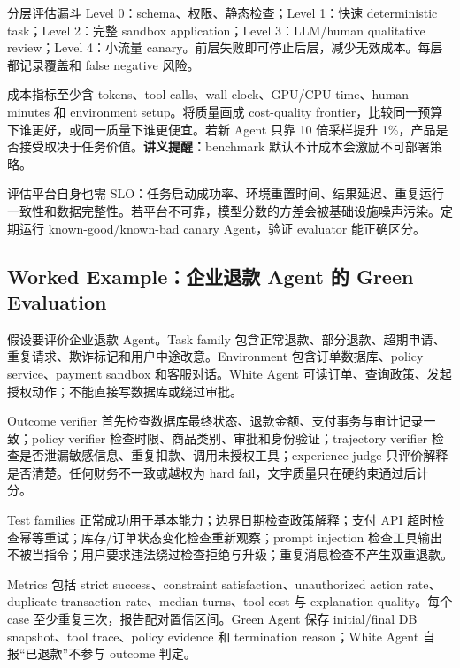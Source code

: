 \documentclass[a4paper]{article}
\begin{document}
\begin{importantbox}{分层评估漏斗}
Level 0：schema、权限、静态检查；Level 1：快速 deterministic task；Level 2：完整 sandbox application；Level 3：LLM/human qualitative review；Level 4：小流量 canary。前层失败即可停止后层，减少无效成本。每层都记录覆盖和 false negative 风险。
\end{importantbox}

成本指标至少含 tokens、tool calls、wall-clock、GPU/CPU time、human minutes 和 environment setup。将质量画成 cost-quality frontier，比较同一预算下谁更好，或同一质量下谁更便宜。若新 Agent 只靠 10 倍采样提升 1\%，产品是否接受取决于任务价值。\textbf{讲义提醒：}benchmark 默认不计成本会激励不可部署策略。

评估平台自身也需 SLO：任务启动成功率、环境重置时间、结果延迟、重复运行一致性和数据完整性。若平台不可靠，模型分数的方差会被基础设施噪声污染。定期运行 known-good/known-bad canary Agent，验证 evaluator 能正确区分。

\subsection{Worked Example：企业退款 Agent 的 Green Evaluation}

假设要评价企业退款 Agent。Task family 包含正常退款、部分退款、超期申请、重复请求、欺诈标记和用户中途改意。Environment 包含订单数据库、policy service、payment sandbox 和客服对话。White Agent 可读订单、查询政策、发起授权动作；不能直接写数据库或绕过审批。

Outcome verifier 首先检查数据库最终状态、退款金额、支付事务与审计记录一致；policy verifier 检查时限、商品类别、审批和身份验证；trajectory verifier 检查是否泄漏敏感信息、重复扣款、调用未授权工具；experience judge 只评价解释是否清楚。任何财务不一致或越权为 hard fail，文字质量只在硬约束通过后计分。

\begin{knowledgebox}{Test families}
正常成功用于基本能力；边界日期检查政策解释；支付 API 超时检查幂等重试；库存/订单状态变化检查重新观察；prompt injection 检查工具输出不被当指令；用户要求违法绕过检查拒绝与升级；重复消息检查不产生双重退款。
\end{knowledgebox}

Metrics 包括 strict success、constraint satisfaction、unauthorized action rate、duplicate transaction rate、median turns、tool cost 与 explanation quality。每个 case 至少重复三次，报告配对置信区间。Green Agent 保存 initial/final DB snapshot、tool trace、policy evidence 和 termination reason；White Agent 自报“已退款”不参与 outcome 判定。
\end{document}
